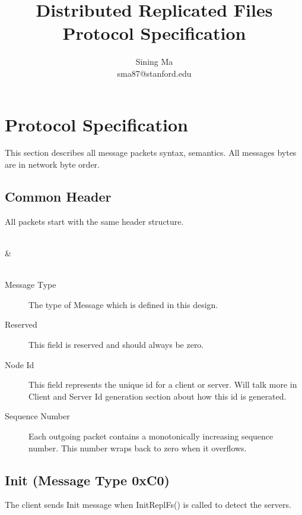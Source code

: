 \documentclass[12pt,fleqn]{article}
\begin{document}
\title{Distributed Replicated Files Protocol Specification}
\author{Sining Ma \\ sma87@stanford.edu}

\maketitle

\section{Protocol Specification}
This section describes all message packets syntax, semantics. All messages bytes are in network byte order. 

\subsection{Common Header}
All packets start with the same header structure.

\begin{center}
	\begin{bytefield}[bitwidth=1.1em]{16}
		 \\
		 &  \\
		 \\
	\end{bytefield}
\end{center}

\begin{description}
	\item[Message Type] The type of Message which is defined in this design.
	\item[Reserved] This field is reserved and should always be zero.
	\item[Node Id] This field represents the unique id for a client or server. Will talk more in Client and Server Id generation section about how this id is generated.
	\item[Sequence Number] Each outgoing packet contains a monotonically increasing sequence number. This number wraps back to zero when it overflows.
\end{description}

\subsection{Init (Message Type 0xC0)}
The client sends Init message when InitReplFs() is called to detect the servers.
\end{document}
